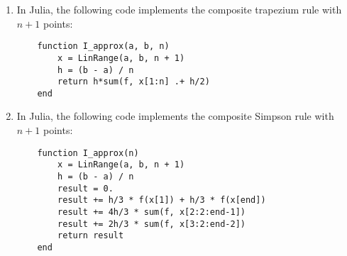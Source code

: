 \documentclass{article}
\begin{document}
\begin{enumerate}
    \item
        In Julia, the following code implements the composite trapezium rule with $n+1$ points:
        \begin{verbatim}
    function I_approx(a, b, n)
        x = LinRange(a, b, n + 1)
        h = (b - a) / n
        return h*sum(f, x[1:n] .+ h/2)
    end
        \end{verbatim}

    \item
        In Julia, the following code implements the composite Simpson rule with $n+1$ points:
        \begin{verbatim}
    function I_approx(n)
        x = LinRange(a, b, n + 1)
        h = (b - a) / n
        result = 0.
        result += h/3 * f(x[1]) + h/3 * f(x[end])
        result += 4h/3 * sum(f, x[2:2:end-1])
        result += 2h/3 * sum(f, x[3:2:end-2])
        return result
    end
        \end{verbatim}
    \end{enumerate}
\end{document}
